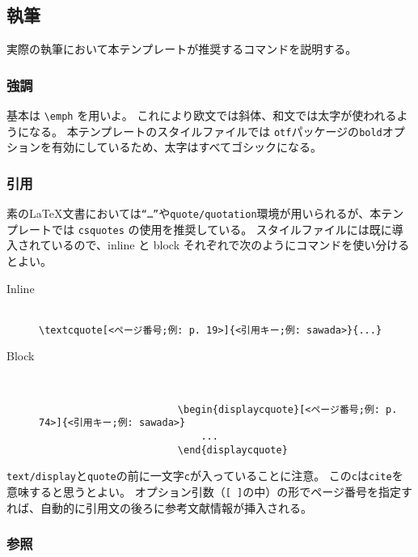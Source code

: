 		\subsection{執筆}
			\label{sub:writing}

			実際の執筆において本テンプレートが推奨するコマンドを説明する。

			\subsubsection{強調}

				基本は \texttt{\textbackslash emph} を用いよ。
				これにより欧文では斜体、和文では太字が使われるようになる。
				本テンプレートのスタイルファイルでは \texttt{otf}パッケージの\texttt{bold}オプションを有効にしているため、太字はすべてゴシックになる。

			\subsubsection{引用}

				素の\LaTeX 文書においては\texttt{``\dots''}や\texttt{quote/quotation}環境が用いられるが、本テンプレートでは \texttt{csquotes} の使用を推奨している。
				スタイルファイルには既に導入されているので、inline と block それぞれで次のようにコマンドを使い分けるとよい。

				\begin{description}
					\item[Inline] 　\\
						\verb|\textcquote[<ページ番号;例: p. 19>]{<引用キー;例: sawada>}{...}|
					\item[Block] 　
					\begin{verbatim}
						\begin{displaycquote}[<ページ番号;例: p. 74>]{<引用キー;例: sawada>}
							...
						\end{displaycquote}
					\end{verbatim}
				\end{description}

				\noindent
				\texttt{text/display}と\texttt{quote}の前に一文字\texttt{c}が入っていることに注意。
				この\texttt{c}は\texttt{cite}を意味すると思うとよい。
				オプション引数（\texttt{[ ]}の中）の形でページ番号を指定すれば、自動的に引用文の後ろに参考文献情報が挿入される。

			\subsubsection{参照}

